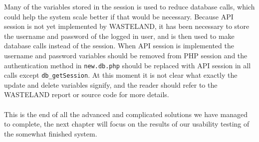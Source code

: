 Many of the variables stored in the session is used to reduce database calls, which could help the system scale better if that would be necessary. Because API session is not yet implemented by WASTELAND, it has been necessary to store the username and password of the logged in user, and is then used to make database calls instead of the session. When API session is implemented the username and password variables should be removed from PHP session and the authentication method in \texttt{new.db.php} should be replaced with API session in all calls except \texttt{db\_getSession}. At this moment it is not clear what exactly the update and delete variables signify, and the reader should refer to the WASTELAND report or source code for more details.\\
\\
This is the end of all the advanced and complicated solutions we have managed to complete, the next chapter will focus on the results of our usability testing of the somewhat finished system.